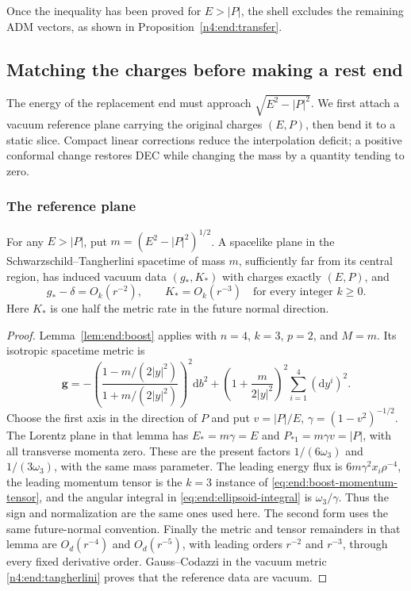 Once the inequality has been proved for \(E>|P|\), the shell excludes
the remaining ADM vectors, as shown in Proposition~\ref{n4:end:transfer}.

\subsection{Matching the charges before making a rest end}

The energy of the replacement end must approach $\sqrt{E^2-|P|^2}$.
We first attach a vacuum reference plane carrying the original charges
$(E,P)$, then bend it to a static slice. Compact linear corrections
reduce the interpolation deficit; a positive conformal change restores
DEC while changing the mass by a quantity tending to zero.

\subsubsection{The reference plane}

\begin{lemma}\label{n4:end:boosted-plane}
For any \(E>|P|\), put \(m=(E^2-|P|^2)^{1/2}\). A spacelike plane
in the Schwarzschild--Tangherlini spacetime of mass \(m\), sufficiently
far from its central region, has induced vacuum data \((g_*,K_*)\)
with charges exactly \((E,P)\), and
\[
 g_*-\delta=O_k(r^{-2}),\qquad K_*=O_k(r^{-3})
 \quad\text{for every integer }k\ge0.
\]
Here \(K_*\) is one half the metric rate in the future normal direction.
\end{lemma}

\begin{proof}
Lemma~\ref{lem:end:boost} applies with $n=4$, $k=3$, $p=2$, and
$M=m$. Its isotropic spacetime metric is
\begin{equation}\label{n4:end:tangherlini}
 \mathbf g=-\left(\frac{1-m/(2|y|^2)}{1+m/(2|y|^2)}\right)^2\mathrm db^2
       +\left(1+\frac{m}{2|y|^2}\right)^2\sum_{i=1}^4(\mathrm dy^i)^2.
\end{equation}
Choose the first axis in the direction of $P$ and put $v=|P|/E$,
$\gamma=(1-v^2)^{-1/2}$. The Lorentz plane in that lemma has
\(E_*=m\gamma=E\) and \(P_{*1}=m\gamma v=|P|\), with all transverse
momenta zero. These are the present factors $1/(6\omega_3)$ and
$1/(3\omega_3)$, with the same mass parameter. The leading energy
flux is $6m\gamma^2 x_i\rho^{-4}$, the leading momentum tensor is
the $k=3$ instance of \eqref{eq:end:boost-momentum-tensor}, and the
angular integral in \eqref{eq:end:ellipsoid-integral} is
$\omega_3/\gamma$. Thus the sign and normalization are the same
ones used here. The second form uses the same future-normal convention.
Finally the metric and tensor remainders in that lemma are
$O_d(r^{-4})$ and $O_d(r^{-5})$, with leading orders $r^{-2}$ and
$r^{-3}$, through every fixed derivative order. Gauss--Codazzi in the
vacuum metric \eqref{n4:end:tangherlini} proves that the reference data
are vacuum.
\end{proof}

